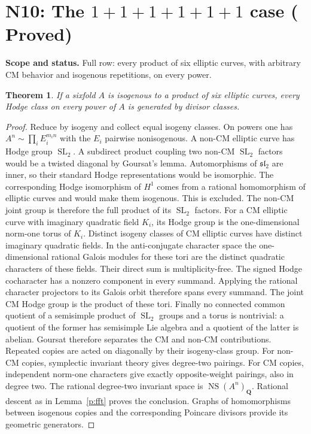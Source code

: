 \documentclass[11pt,reqno]{article}
\theoremstyle{emphasizedplain}
\DeclareRobustCommand{\provedstatus}{%
  \texorpdfstring{\textcolor{ProvedGreen}{\textbf{Proved}}}{Proved}}
\newtheorem{theorem}{Theorem}[section]
\theoremstyle{emphasizeddefinition}
\theoremstyle{emphasizeddefinition}
\DeclareMathOperator{\SL}{SL}
\DeclareMathOperator{\NS}{NS}
\newcommand{\Q}{\mathbf Q}
\newcommand{\status}[1]{%
  \par\nobreak\smallskip\noindent
  {\setlength{\fboxsep}{7pt}%
   \colorbox{ScopeBackground}{%
    \parbox{\dimexpr\linewidth-2\fboxsep\relax}{%
     \small\textbf{\textcolor{HeadingInk}{Scope and status.}} #1}}}%
  \par\nobreak\medskip}
\begin{document}
\section{N10: The \texorpdfstring{$1+1+1+1+1+1$}{1+1+1+1+1+1} case (\provedstatus)}\label{sec:N10}

\status{Full row: every product of six elliptic curves, with arbitrary
CM behavior and isogenous repetitions, on every power.}
\begin{theorem}
If a sixfold $A$ is isogenous to a product of six elliptic curves, every
Hodge class on every power of $A$ is generated by divisor classes.
\end{theorem}
\begin{proof}
Reduce by isogeny and collect equal isogeny classes. On powers one has
$A^n\sim\prod_i E_i^{m_i n}$ with the $E_i$ pairwise nonisogenous.
A non-CM elliptic curve has Hodge group $\SL_2$.
A subdirect product coupling two non-CM $\SL_2$ factors would be a twisted
diagonal by Goursat's lemma. Automorphisms of $\mathfrak{sl}_2$ are inner,
so their standard Hodge representations would be isomorphic. The
corresponding Hodge isomorphism of $H^1$ comes from a rational
homomorphism of elliptic curves and would make them isogenous.
This is excluded. The non-CM joint group is therefore the full product
of its $\SL_2$ factors.
For a CM elliptic curve with imaginary quadratic field $K_i$, its Hodge
group is the one-dimensional norm-one torus of $K_i$.
Distinct isogeny classes of CM elliptic curves have distinct imaginary
quadratic fields. In the anti-conjugate character space the one-dimensional
rational Galois modules for these tori are the distinct quadratic characters
of these fields. Their direct sum is multiplicity-free. The signed Hodge
cocharacter has a nonzero component in every summand. Applying the
rational character projectors to its Galois orbit therefore spans every
summand. The joint CM Hodge group is the product of these tori.
Finally no connected common quotient of a semisimple product of $\SL_2$
groups and a torus is nontrivial: a quotient of the former has semisimple
Lie algebra and a quotient of the latter is abelian. Goursat therefore
separates the CM and non-CM contributions.
Repeated copies are acted on diagonally by their isogeny-class group.
For non-CM copies, symplectic invariant theory gives degree-two pairings.
For CM copies, independent norm-one characters give exactly opposite-weight
pairings, also in degree two. The rational degree-two invariant space is
$\NS(A^n)_\Q$. Rational descent as in Lemma~\ref{p:fft} proves the conclusion.
Graphs of homomorphisms between isogenous copies and the corresponding
Poincare divisors provide its geometric generators.
\end{proof}
\end{document}
